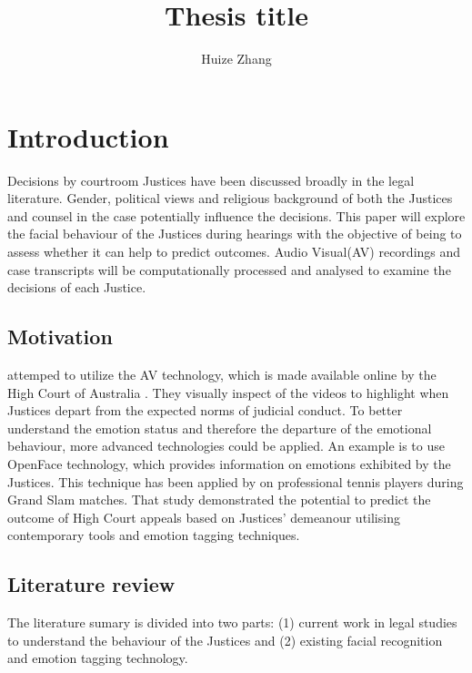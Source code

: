\documentclass{monashthesis}
\author{Huize Zhang}
\title{Thesis title}
\begin{document}

\titlepage

{\sf\tighttoc\doublespacing}

\clearpage{}\setcounter{page}{0}

\hypertarget{ch:intro}{%
\chapter{Introduction}\label{ch:intro}}

Decisions by courtroom Justices have been discussed broadly in the legal literature. Gender, political views and religious background of both the Justices and counsel in the case potentially influence the decisions. This paper will explore the facial behaviour of the Justices during hearings with the objective of being to assess whether it can help to predict outcomes. Audio Visual(AV) recordings and case transcripts will be computationally processed and analysed to examine the decisions of each Justice.

\hypertarget{motivation}{%
\section{Motivation}\label{motivation}}

\textcite{tutton2018judicial} attemped to utilize the AV technology, which is made available online by the High Court of Australia \autocite{highcourtau}. They visually inspect of the videos to highlight when Justices depart from the expected norms of judicial conduct. To better understand the emotion status and therefore the departure of the emotional behaviour, more advanced technologies could be applied. An example is to use OpenFace \autocite*{baltrusaitis2018openface} technology, which provides information on emotions exhibited by the Justices. This technique has been applied by \textcite{kovalchik2018going} on professional tennis players during Grand Slam matches. That study demonstrated the potential to predict the outcome of High Court appeals based on Justices' demeanour utilising contemporary tools and emotion tagging techniques.

\hypertarget{literature-review}{%
\section{Literature review}\label{literature-review}}

The literature sumary is divided into two parts: (1) current work in legal studies to understand the behaviour of the Justices and (2) existing facial recognition and emotion tagging technology.
\end{document}

